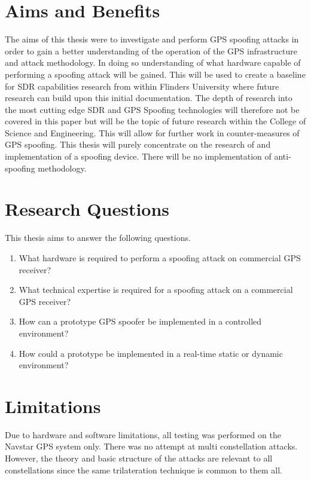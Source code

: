\section{Aims and Benefits}\label{sec:Aims}
The aims of this thesis were to investigate and perform GPS spoofing attacks in order to gain a better understanding of the operation of the GPS infrastructure and attack
methodology. In doing so understanding of what hardware capable of performing a spoofing attack will be gained. This will be used to create a baseline for SDR capabilities research from within Flinders University where future research can build upon this initial documentation.
The depth of research into the most cutting edge SDR and GPS Spoofing technologies will therefore not be covered in this paper but will be the topic of future research
within the College of Science and Engineering. This will
allow for further work in counter-measures of GPS spoofing.
This thesis will purely concentrate on the research of and implementation of a spoofing device. There will be no implementation of anti-spoofing methodology.

\section{Research Questions}\label{sec:RQs}
This thesis aims to answer the following questions.
\begin{enumerate}
    \item What hardware is required to perform a spoofing attack on commercial GPS receiver?
    \item What technical expertise is required for a spoofing attack on a commercial GPS receiver?
    \item How can a prototype GPS spoofer be implemented in a controlled environment?
    \item How could a prototype be implemented in a real-time static or dynamic environment? 
\end{enumerate}

\section{Limitations}\label{sec:Limits}
Due to hardware and software limitations, all testing was performed on the Navstar GPS system only. There was no attempt at multi constellation attacks. However, the theory and basic
structure of the attacks are relevant to all constellations since the same trilateration technique is common to them all.

